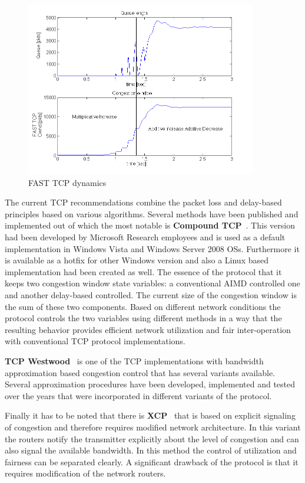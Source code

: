 \documentclass[a4paper]{article}
\begin{document}
\begin{figure}[H]
    \centering
    \includegraphics[width=0.9\textwidth]{figures/FAST.png}
    \caption{FAST TCP dynamics}
    \label{fig:FastTCP}
\end{figure}

The current TCP recommendations combine the packet loss and delay-based principles based on various algorithms. Several
methods have been published and implemented out of which the most notable is \textbf{Compound TCP}~\cite{CompundTCP}.
This version had been developed by Microsoft Research employees and is used as a default implementation in Windows
Vista and Windows Server 2008 OSs. Furthermore it is available as a hotfix for other Windows version and also a Linux
based implementation had been created as well. The essence of the protocol that it keeps two congestion window state
variables: a conventional AIMD controlled one and another delay-based controlled. The current size of the congestion
window is the sum of these two components. Based on different network conditions the protocol controls the two
variables using different methods in a way that the resulting behavior provides efficient network utilization and fair
inter-operation with conventional TCP protocol implementations.

\textbf{TCP Westwood}~\cite{TCPWestwood} is one of the TCP implementations with bandwidth approximation based
congestion control that has several variants available. Several approximation procedures have been developed,
implemented and tested over the years that were incorporated in different variants of the protocol.

Finally it has to be noted that there is \textbf{XCP}~\cite{XCP} that is based on explicit signaling of congestion and
therefore requires modified network architecture. In this variant the routers notify the transmitter explicitly about
the level of congestion and can also signal the available bandwidth. In this method the control of utilization and
fairness can be separated clearly. A significant drawback of the protocol is that it requires modification of the
network routers.
\end{document}
